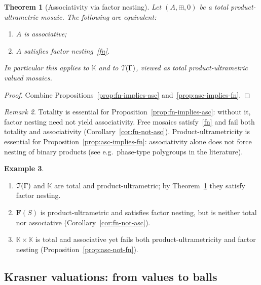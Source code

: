 \documentclass[11pt]{amsart}
\theoremstyle{plain}
\newtheorem{theorem}{Theorem}[section]
\theoremstyle{definition}
\newtheorem{example}[theorem]{Example}
\theoremstyle{remark}
\newtheorem{remark}[theorem]{Remark}
\newcommand{\T}{\EuScript{T}}
\begin{document}
\begin{theorem}[Associativity via factor nesting]
\label{thm:asc-fn}
Let \((A,\boxplus,0)\) be a total product-ultrametric mosaic. The following are equivalent:
\begin{enumerate}[label=(\roman*)]
\item\label{asc-i} \(A\) is associative;
\item\label{fn-i} \(A\) satisfies factor nesting~\eqref{fn}.
\end{enumerate}
In particular this applies to \(\mathbb{K}\) and to \(\T(\Gamma)\), viewed as total product-ultrametric valued mosaics.
\end{theorem}

\begin{proof}
Combine Propositions~\ref{prop:fn-implies-asc} and~\ref{prop:asc-implies-fn}.
\end{proof}

\begin{remark}
\label{rem:fn-proof-note}
Totality is essential for Proposition~\ref{prop:fn-implies-asc}: without it, factor nesting need not yield associativity. Free mosaics satisfy~\eqref{fn} and fail both totality and associativity (Corollary~\ref{cor:fn-not-asc}). Product-ultrametricity is essential for Proposition~\ref{prop:asc-implies-fn}: associativity alone does not force nesting of binary products (see e.g.\ phase-type polygroups in the literature).
\end{remark}

\begin{example}
\label{ex:fn-examples}
\begin{enumerate}[label=(\alph*)]
\item \(\T(\Gamma)\) and \(\mathbb{K}\) are total and product-ultrametric; by Theorem~\ref{thm:asc-fn} they satisfy factor nesting. 
\item \(\mathbf{F}(S)\) is product-ultrametric and satisfies factor nesting, but is neither total nor associative (Corollary~\ref{cor:fn-not-asc}).
\item \(\mathbb{K}\times\mathbb{K}\) is total and associative yet fails both product-ultrametricity and factor nesting (Proposition~\ref{prop:asc-not-fn}).
\end{enumerate}
\end{example}

\subsection{Krasner valuations: from values to balls}
\end{document}
